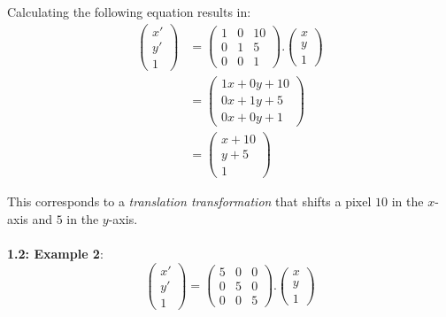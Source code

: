 \documentclass[12pt]{article}
\begin{document}
Calculating the following equation results in:
\begin{align*}
    \begin{pmatrix}
        x' \\
        y' \\
        1 
    \end{pmatrix} &= 
    \begin{pmatrix}
        1 & 0 & 10 \\
        0 & 1 & 5 \\
        0 & 0 & 1
    \end{pmatrix} . 
    \begin{pmatrix}
        x \\
        y \\
        1
    \end{pmatrix} \\ &=
    \left(\begin{matrix}
        1x+0y+10 \\
        0x+1y+5 \\
        0x+0y+1
    \end{matrix}\right) \\ &=
    \left(\begin{matrix}
        x+10 \\
        y+5 \\
        1
    \end{matrix}\right)
\end{align*}

This corresponds to a \textit{translation transformation} that shifts a pixel
$10$ in the $x$-axis and $5$ in the $y$-axis. 
\\
\\
\textbf{1.2: Example 2}: 
\begin{equation*}
    \begin{pmatrix}
        x' \\
        y' \\
        1 
    \end{pmatrix} = 
    \begin{pmatrix}
        5 & 0 & 0 \\
        0 & 5 & 0 \\
        0 & 0 & 5
    \end{pmatrix} . 
    \begin{pmatrix}
        x \\
        y \\
        1
    \end{pmatrix}
\end{equation*}
\end{document}
